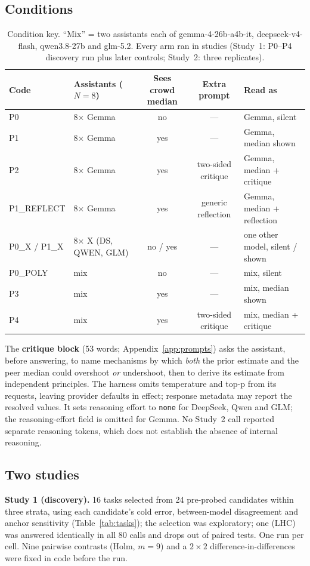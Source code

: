 \documentclass[10pt]{article}
\newenvironment{fittable}{\begin{lrbox}{\manuscripttable}}{%
\end{lrbox}\ifdim\wd\manuscripttable>\linewidth
\resizebox{\linewidth}{!}{\usebox{\manuscripttable}}%
\else\usebox{\manuscripttable}\fi}
\theoremstyle{manuscript}\newtheorem{proposition}{Proposition}
\begin{document}
\subsection{Conditions}
\begin{table}[ht]\centering\small\setlength{\tabcolsep}{4.5pt}
\caption{Condition key. ``Mix'' = two assistants each of gemma-4-26b-a4b-it, deepseek-v4-flash, qwen3.8-27b and glm-5.2. Every arm ran in studies (Study~1: P0--P4 discovery run plus later controls; Study~2: three replicates).}\label{tab:cond}
\begin{fittable}
\begin{tabular}{@{}llccl@{}}\toprule
Code & Assistants ($N=8$) & Sees crowd median & Extra prompt & Read as\\\midrule
P0 & 8$\times$ Gemma & no & --- & Gemma, silent\\
P1 & 8$\times$ Gemma & yes & --- & Gemma, median shown\\
P2 & 8$\times$ Gemma & yes & two-sided critique & Gemma, median + critique\\
P1\_REFLECT & 8$\times$ Gemma & yes & generic reflection & Gemma, median + reflection\\
P0\_X / P1\_X & 8$\times$ X (DS, QWEN, GLM) & no / yes & --- & one other model, silent / shown\\
P0\_POLY & mix & no & --- & mix, silent\\
P3 & mix & yes & --- & mix, median shown\\
P4 & mix & yes & two-sided critique & mix, median + critique\\\bottomrule
\end{tabular}
\end{fittable}
\end{table}

\noindent The \textbf{critique block} (53 words; Appendix~\ref{app:prompts}) asks the assistant, before answering, to name mechanisms by which \emph{both} the prior estimate and the peer median could overshoot \emph{or} undershoot, then to derive its estimate from independent principles. The harness omits temperature and top-p from its requests, leaving provider defaults in effect; response metadata may report the resolved values. It sets reasoning effort to \texttt{none} for DeepSeek, Qwen and GLM; the reasoning-effort field is omitted for Gemma. No Study~2 call reported separate reasoning tokens, which does not establish the absence of internal reasoning.

\subsection{Two studies}
\textbf{Study 1 (discovery).} 16 tasks selected from 24 pre-probed candidates within three strata, using each candidate's cold error, between-model disagreement and anchor sensitivity (Table~\ref{tab:tasks}); the selection was exploratory; one (LHC) was answered identically in all 80 calls and drops out of paired tests. One run per cell. Nine pairwise contrasts (Holm, $m=9$) and a $2\times2$ difference-in-differences were fixed in code before the run.
\end{document}
